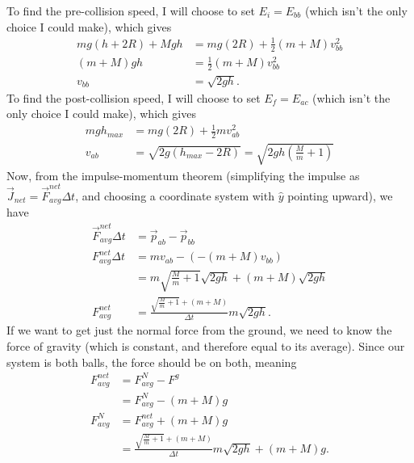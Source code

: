 \documentclass[]{article}
\begin{document}
\begin{TeacherMargin}
\noindent To find the pre-collision speed, I will choose to set $E_{i}=E_{bb}$ (which isn't the only choice I could make), which gives
\begin{align*}
	mg(h+2R) + Mgh & = mg(2R) + \frac{1}{2}(m+M)v_{bb}^{2} \\
	(m+M)gh & = \frac{1}{2}(m+M)v_{bb}^{2} \\
	v_{bb} & = \sqrt{2gh}.
\end{align*}
To find the post-collision speed, I will choose to set $E_{f}=E_{ac}$ (which isn't the only choice I could make), which gives
\begin{align*}
	mgh_{max} & = mg(2R) + \frac{1}{2}mv_{ab}^{2} \\
	v_{ab} & = \sqrt{2g(h_{max}-2R)} = \sqrt{2gh\left(\frac{M}{m}+1\right)}
\end{align*}
Now, from the impulse-momentum theorem (simplifying the impulse as $\vec{J}_{net} = \vec{F}^{net}_{avg}\Delta t$, and choosing a coordinate system with $\hat{y}$ pointing upward), we have
\begin{align*}
	\vec{F}^{net}_{avg}\Delta t & = \vec{p}_{ab} - \vec{p}_{bb} \\
	F^{net}_{avg}\Delta t& = mv_{ab} - \left(-(m+M)v_{bb}\right) \\
	& = m\sqrt{\frac{M}{m}+1}\sqrt{2gh} + (m+M)\sqrt{2gh} \\
	F^{net}_{avg} & = \frac{\sqrt{\frac{M}{m}+1} + (m+M)}{\Delta t}m\sqrt{2gh}.
\end{align*}
If we want to get just the normal force from the ground, we need to know the force of gravity (which is constant, and therefore equal to its average). Since our system is both balls, the force should be on both, meaning
\begin{align*}
	F^{net}_{avg} & = F^{N}_{avg} - F^{g} \\
	& = F^{N}_{avg} - (m+M)g \\
	F^{N}_{avg} & = F^{net}_{avg} + (m+M)g \\
	& = \frac{\sqrt{\frac{M}{m}+1} + (m+M)}{\Delta t}m\sqrt{2gh} + (m+M)g.
\end{align*}
\end{TeacherMargin}
\end{document}
